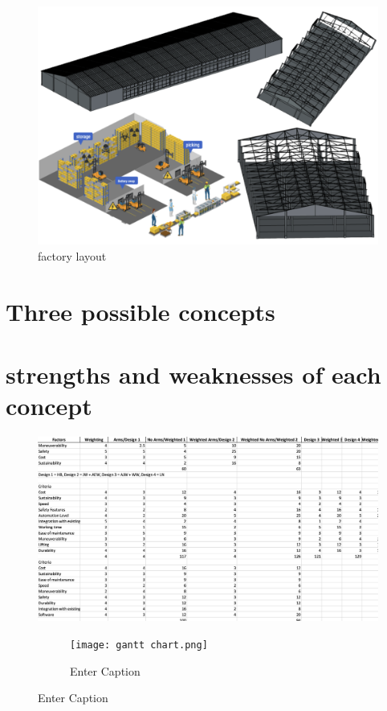 \documentclass[12pt]{article}
\begin{document}
\begin{figure}[h!]
    \centering
     \includegraphics[width=1\textwidth]{factory layout1}
        \caption{factory layout}
         \label{fig:factory layout}
\end{figure}

\section{Three possible concepts}

\section{strengths and weaknesses of each concept}
\begin{figure}[h!]
    \centering
     \includegraphics[width=1\textwidth]{matrix.png}
        \caption{matrix}
         \label{fig:matrix}
\begin{figure}
    \centering
    \texttt{[image: gantt chart.png]}
    \caption{Enter Caption}
    \label{fig:enter-label}
\end{figure}
\end{figure}
 
\end{document}
